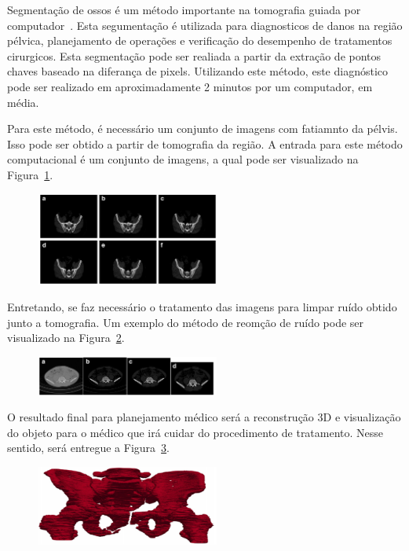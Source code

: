 \documentclass[letterpaper, 10 pt, conference]{ieeeconf}
\begin{document}
Segmentação de ossos é um método importante na tomografia guiada por computador~\cite{Yu2018May}.
%
Esta segumentação é utilizada para diagnosticos de danos na região pélvica, planejamento de operações e verificação do desempenho de tratamentos cirurgicos.
%
Esta segmentação pode ser realiada a partir da extração de pontos chaves baseado na diferança de pixels.
%
Utilizando este método, este diagnóstico pode ser realizado em aproximadamente 2 minutos por um computador, em média.

Para este método, é necessário um conjunto de imagens com fatiamnto da pélvis.
%
Isso pode ser obtido a partir de tomografia da região.
%
A entrada para este método computacional é um conjunto de imagens, a qual pode ser visualizado na Figura~\ref{fig:pelvis_contraste}.

\begin{figure}[htb]
\label{fig:pelvis_contraste}
\includegraphics[width=6cm]{./img/pelvis_contraste.png}
\centering
\end{figure}

Entretando, se faz necessário o tratamento das imagens para limpar ruído obtido junto a tomografia.
%
Um exemplo do método de reomção de ruído pode ser visualizado na Figura~\ref{fig:pelvis_reconstrucao}.

\begin{figure}[htb]
\label{fig:pelvis_reconstrucao}
\includegraphics[width=6cm]{./img/pelvis_reconstrucao.png}
\centering
\end{figure}

O resultado final para planejamento médico será a reconstrução 3D e visualização do objeto para o médico que irá cuidar do procedimento de tratamento.
%
Nesse sentido, será entregue a Figura~\ref{fig:pelvis_final}.

\begin{figure}[htb]
\label{fig:pelvis_final}
\includegraphics[width=6cm]{./img/pelvis_final.png}
\centering
\end{figure}
\end{document}
